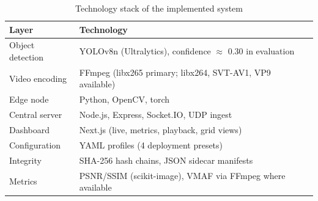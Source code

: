 \begin{table}[H]
\centering
\caption{Technology stack of the implemented system}
\label{tab:tech-stack}
\begin{tabular}{|l|l|}
\hline
\textbf{Layer} & \textbf{Technology} \\
\hline
Object detection & YOLOv8n (Ultralytics), confidence $\approx$ 0.30 in evaluation \\
Video encoding & FFmpeg (libx265 primary; libx264, SVT-AV1, VP9 available) \\
Edge node & Python, OpenCV, torch \\
Central server & Node.js, Express, Socket.IO, UDP ingest \\
Dashboard & Next.js (live, metrics, playback, grid views) \\
Configuration & YAML profiles (4 deployment presets) \\
Integrity & SHA-256 hash chains, JSON sidecar manifests \\
Metrics & PSNR/SSIM (scikit-image), VMAF via FFmpeg where available \\
\hline
\end{tabular}
\end{table}
